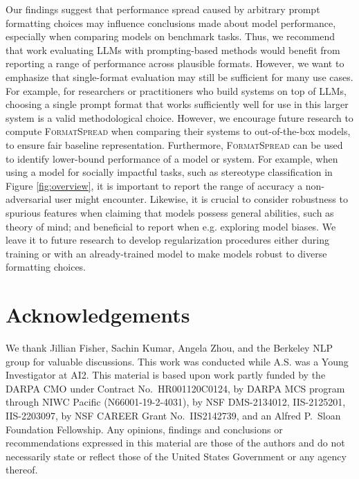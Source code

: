 \documentclass{article} %
\newcommand{\toolname}[1]{}
\renewcommand{\toolname}[1]{{\color{black} \textsc{FormatSpread}}}
\begin{document}
Our findings suggest that performance spread caused by arbitrary prompt formatting choices may influence conclusions made about model performance, especially when comparing models on benchmark tasks.
Thus, we recommend that work evaluating LLMs with prompting-based methods would benefit from reporting a range of performance across plausible formats.
However, we want to emphasize that single-format evaluation may still be sufficient for many use cases.
For example, for researchers or practitioners who build systems on top of LLMs, choosing a single prompt format that works sufficiently well for use in this larger system is a valid methodological choice.
However, we encourage future research to compute \toolname{} when comparing their systems to out-of-the-box models, to ensure fair baseline representation. 
Furthermore, \toolname{} can be used to identify lower-bound performance of a model or system. 
For example, when using a model for socially impactful tasks, such as stereotype classification in Figure \ref{fig:overview}, it is important to report the range of accuracy a non-adversarial user might encounter. Likewise, it is crucial to consider robustness to spurious features when claiming that models possess general abilities, such as theory of mind; and beneficial to report when e.g. exploring model biases. We leave it to future research to develop regularization procedures either during training or with an already-trained model to make models robust to diverse formatting choices.

\section{Acknowledgements}
We thank Jillian Fisher, Sachin Kumar, Angela Zhou, and the Berkeley NLP group for valuable discussions. 
This work was conducted while A.S. was a Young Investigator at AI2.
This material is based upon work partly funded by the DARPA CMO under Contract No.~HR001120C0124, by DARPA MCS program through NIWC Pacific (N66001-19-2-4031), by NSF DMS-2134012, IIS-2125201, IIS-2203097, by NSF CAREER Grant No.~IIS2142739, and an Alfred P.~Sloan Foundation Fellowship. Any opinions, findings and conclusions or recommendations expressed in this material are those of the authors and do not necessarily state or reflect those of the United States Government or any agency thereof.
\end{document}
